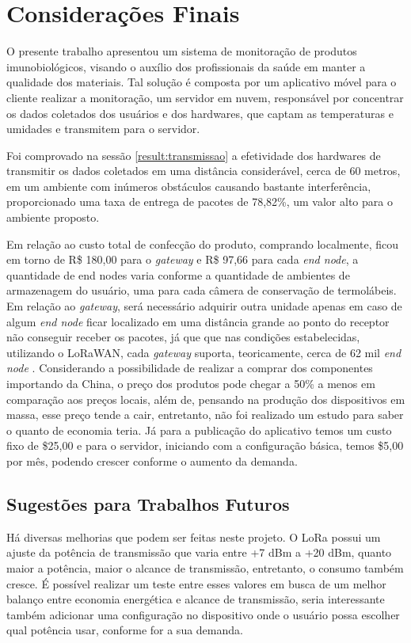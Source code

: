 \chapter{Considerações Finais}
\label{cap:conclusao}
O presente trabalho apresentou um sistema de monitoração de produtos imunobiológicos, visando o auxílio dos profissionais da saúde em manter a qualidade dos materiais. Tal solução é composta por um aplicativo móvel para o cliente realizar a monitoração, um servidor em nuvem, responsável por concentrar os dados coletados dos usuários e dos hardwares, que captam as temperaturas e umidades e transmitem para o servidor.

Foi comprovado na sessão \ref{result:transmissao} a efetividade dos hardwares de transmitir os dados coletados em uma distância considerável, cerca de 60 metros, em um ambiente com inúmeros obstáculos causando bastante interferência, proporcionado uma taxa de entrega de pacotes de 78,82\%, um valor alto para o ambiente proposto.
 
Em relação ao custo total de confecção do produto, comprando localmente, ficou  em torno de R\$ 180,00 para o \textit{gateway} e R\$ 97,66 para cada \textit{end node}, a quantidade de end nodes varia conforme a quantidade de ambientes de armazenagem do usuário, uma para cada câmera de conservação de termolábeis. Em relação ao \textit{gateway}, será necessário adquirir outra unidade apenas em caso de algum \textit{end node} ficar localizado em uma distância grande ao ponto do receptor não conseguir receber os pacotes, já que que nas condições estabelecidas, utilizando o LoRaWAN, cada \textit{gateway} suporta, teoricamente, cerca de 62 mil \textit{end node} \cite{lora2021specification}. Considerando a possibilidade de realizar a comprar dos componentes importando da China, o preço dos produtos pode chegar a 50\% a menos em comparação aos preços locais, além de, pensando na produção dos dispositivos em massa, esse preço tende a cair, entretanto, não foi realizado um estudo para saber o quanto de economia teria. Já para a publicação do aplicativo temos um custo fixo de \$25,00 e para o servidor, iniciando com a configuração básica, temos \$5,00 por mês, podendo crescer conforme o aumento da demanda.


\section{Sugestões para Trabalhos Futuros}
\label{conclusao:futuros}
Há diversas melhorias que podem ser feitas neste projeto. O LoRa possui um ajuste da potência de transmissão que varia entre +7 dBm a +20 dBm, quanto maior a potência, maior o alcance de transmissão, entretanto, o consumo também cresce. É possível realizar um teste entre esses valores em busca de um melhor balanço entre economia energética e alcance de transmissão, seria interessante também adicionar uma configuração no dispositivo onde o usuário possa escolher qual potência usar, conforme for a sua demanda.

